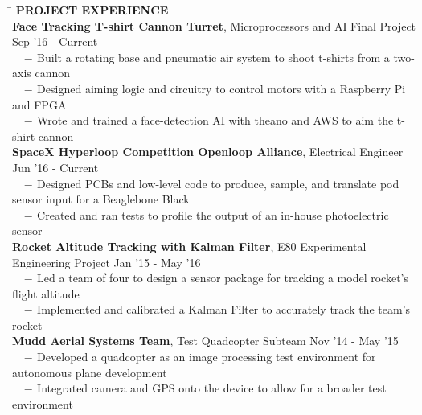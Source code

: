\documentclass[10.75pt]{article}
\newcommand{\sectionNL}{\\[2pt]}
\newcommand{\customtab}{$\hspace{10pt} - \hspace{2pt}$}
\begin{document}
\begin{tabbing} 
	\hspace*{6.5in}\= \kill
	{\textbf{PROJECT EXPERIENCE} } \> \sectionNL

	\textbf{Face Tracking T-shirt Cannon Turret}, Microprocessors and AI Final Project \>Sep '16 - Current \\
	\customtab Built a rotating base and pneumatic air system to shoot t-shirts from a two-axis cannon \\
	\customtab Designed aiming logic and circuitry to control motors with a Raspberry Pi and FPGA \\
	\customtab Wrote and trained a face-detection AI with theano and AWS to aim the t-shirt cannon \\

	\textbf{SpaceX Hyperloop Competition Openloop Alliance}, Electrical Engineer \>Jun '16 - Current \\
	\customtab Designed PCBs and low-level code to produce, sample, and translate pod sensor input for a Beaglebone Black \\
	\customtab Created and ran tests to profile the output of an in-house photoelectric sensor \\

	\textbf{Rocket Altitude Tracking with Kalman Filter}, E80 Experimental Engineering Project \>Jan '15 - May '16 \\
	\customtab Led a team of four to design a sensor package for tracking a model rocket's flight altitude \\
	\customtab Implemented and calibrated a Kalman Filter to accurately track the team's rocket \\



	\textbf{Mudd Aerial Systems Team}, Test Quadcopter Subteam \> Nov '14 - May '15 \\
	\customtab Developed a quadcopter as an image processing test environment for autonomous plane development  \\
	\customtab Integrated camera and GPS onto the device to allow for a broader test environment \\


\end{tabbing}
\end{document}
